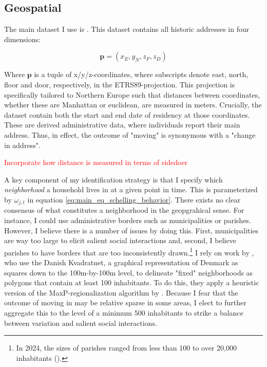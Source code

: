 \documentclass[main.tex]{subfiles}
\begin{document}
\subsection{Geospatial}
\label{sec:data_geospatial}
The main dataset I use is . This dataset contains all historic addresses in four dimensions:

\begin{equation}
    \mathbf{p} = (x_E, y_N, z_F, z_D)
\end{equation}

\noindent
Where $\textbf{p}$ is a tuple of x/y/z-coordinates, where subscripts denote east, north, floor and door, respectively, in the ETRS89-projection. This projection is specifically tailored to Northern Europe such that distances between coordinates, whether these are Manhattan or euclidean, are measured in meters. Crucially, the dataset contain both the start and end date of residency at those coordinates. These are derived administrative data, where individuals report their main address. Thus, in effect, the outcome of "moving" is synonymous with a "change in address". 

\textcolor{red}{Incorporate how distance is measured in terms of sidedoer}

A key component of my identification strategy is that I specify which \textit{neighborhood} a household lives in at a given point in time. This is parameterized by $\omega_{j,t}$ in equation \ref{eq:main_eq_schelling_behavior}. There exists no clear consensus of what constitutes a neighborhood in the geopgrahical sense. For instance, I could use administrative borders such as municipalities or parishes. However, I believe there is a number of issues by doing this. First, municipalities are way too large to elicit salient social interactions and, second, I believe parishes to have borders that are too inconsistently drawn.\footnote{In 2024, the sizes of parishes ranged from less than 100 to over 20,000 inhabitants (\textcite{dst_sogn_stats}).} I rely on work by \textcite{nabolagsatlas_neighborhoods_boje2023}, who use the Danish Kvadratnet, a graphical representation of Denmark as squares down to the 100m-by-100m level, to delineate "fixed" neighborhoods as polygons that contain at least 100 inhabitants. To do this, they apply a heuristic version of the MaxP-regionalization algorithm by \textcite{maxp_heuristic_wei2021efficient}. Because I fear that the outcome of moving in may be relative sparse in some areas, I elect to further aggregate this to the level of a minimum 500 inhabitants to strike a balance between variation and salient social interactions. 
\end{document}
